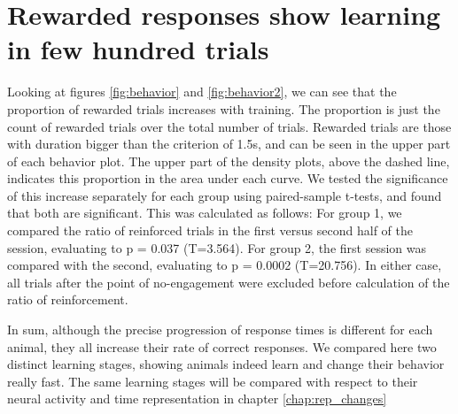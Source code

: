 \section{Rewarded responses show learning in few hundred trials}

    Looking at figures \ref{fig:behavior} and \ref{fig:behavior2}, we can see that the proportion of rewarded trials increases with training. The proportion is just the count of rewarded trials over the total number of trials. Rewarded trials are those with duration bigger than the criterion of 1.5s, and can be seen in the upper part of each behavior plot. The upper part of the density plots, above the dashed line, indicates this proportion in the area under each curve. We tested the significance of this increase separately for each group using paired-sample t-tests, and found that both are significant. This was calculated as follows: For group 1, we compared the ratio of reinforced trials in the first versus second half of the session, evaluating to p = 0.037 (T=3.564). For group 2, the first session was compared with the second, evaluating to p = 0.0002 (T=20.756). In either case, all trials after the point of no-engagement were excluded before calculation of the ratio of reinforcement.
    
    In sum, although the precise progression of response times is different for each animal, they all increase their rate of correct responses. We compared here two distinct learning stages, showing animals indeed learn and change their behavior really fast. The same learning stages will be compared with respect to their neural activity and time representation in chapter \ref{chap:rep_changes}
    